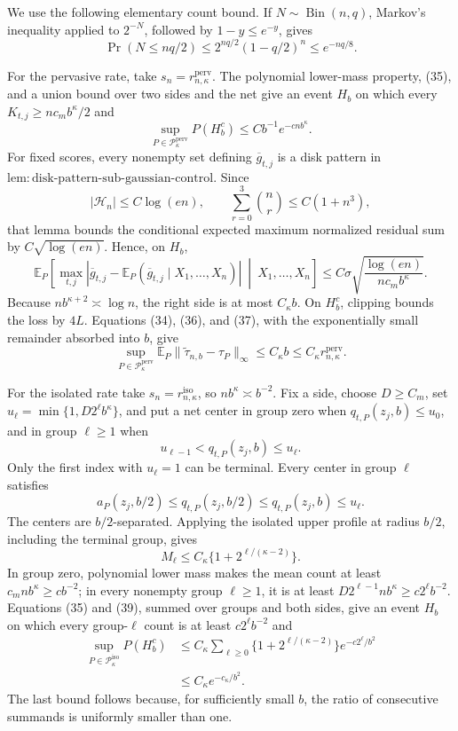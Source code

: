 We use the following elementary count bound. If \(N\sim\operatorname{Bin}(n,q)\), Markov's inequality applied to \(2^{-N}\), followed by \(1-y\le e^{-y}\), gives
\[
 \Pr(N\le nq/2)
 \le2^{nq/2}(1-q/2)^n
 \le e^{-nq/8}. \tag{35}
\]

For the pervasive rate, take \(s_n=r_{n,\kappa}^{\mathrm{perv}}\). The polynomial lower-mass property, (35), and a union bound over two sides and the net give an event \(H_b\) on which every \(K_{t,j}\ge nc_mb^{\kappa}/2\) and
\[
 \sup_{P\in\mathcal P_{\kappa}^{\mathrm{perv}}}P(H_b^c)
 \le Cb^{-1}e^{-cnb^{\kappa}}. \tag{36}
\]
For fixed scores, every nonempty set defining \(\overline g_{t,j}\) is a disk pattern in \(\mathrm{lem:disk\text{-}pattern\text{-}sub\text{-}gaussian\text{-}control}\). Since
\[
 |\mathcal H_n|\le C\log(en),
 \qquad \sum_{r=0}^3\binom nr\le C(1+n^3),
\]
that lemma bounds the conditional expected maximum normalized residual sum by \(C\sqrt{\log(en)}\). Hence, on \(H_b\),
\[
 \mathbb E_P\left[
 \max_{t,j}\left|
 \overline g_{t,j}-\mathbb E_P(\overline g_{t,j}\mid X_1,\ldots,X_n)
 \right|\ \middle|\ X_1,\ldots,X_n\right]
 \le C\sigma\sqrt{\frac{\log(en)}{nc_mb^{\kappa}}}. \tag{37}
\]
Because \(nb^{\kappa+2}\asymp\log n\), the right side is at most \(C_{\kappa}b\). On \(H_b^c\), clipping bounds the loss by \(4L\). Equations (34), (36), and (37), with the exponentially small remainder absorbed into \(b\), give
\[
 \sup_{P\in\mathcal P_{\kappa}^{\mathrm{perv}}}
 \mathbb E_P\lVert\widetilde\tau_{n,b}-\tau_P\rVert_{\infty}
 \le C_{\kappa}b
 \le C_{\kappa}r_{n,\kappa}^{\mathrm{perv}}. \tag{38}
\]

For the isolated rate take \(s_n=r_{n,\kappa}^{\mathrm{iso}}\), so \(nb^{\kappa}\asymp b^{-2}\). Fix a side, choose \(D\ge C_m\), set \(u_\ell=\min\{1,D2^\ell b^{\kappa}\}\), and put a net center in group zero when \(q_{t,P}(z_j,b)\le u_0\), and in group \(\ell\ge1\) when
\[
 u_{\ell-1}<q_{t,P}(z_j,b)\le u_\ell.
\]
Only the first index with \(u_\ell=1\) can be terminal. Every center in group \(\ell\) satisfies
\[
 a_P(z_j,b/2)\le q_{t,P}(z_j,b/2)\le q_{t,P}(z_j,b)\le u_\ell.
\]
The centers are \(b/2\)-separated. Applying the isolated upper profile at radius \(b/2\), including the terminal group, gives
\[
 M_\ell\le C_{\kappa}\{1+2^{\ell/(\kappa-2)}\}. \tag{39}
\]
In group zero, polynomial lower mass makes the mean count at least \(c_mnb^{\kappa}\ge cb^{-2}\); in every nonempty group \(\ell\ge1\), it is at least \(D2^{\ell-1}nb^{\kappa}\ge c2^\ell b^{-2}\). Equations (35) and (39), summed over groups and both sides, give an event \(H_b\) on which every group-\(\ell\) count is at least \(c2^\ell b^{-2}\) and
\[
 \begin{aligned}
 \sup_{P\in\mathcal P_{\kappa}^{\mathrm{iso}}}P(H_b^c)
 &\le C_{\kappa}\sum_{\ell\ge0}
 \{1+2^{\ell/(\kappa-2)}\}e^{-c2^\ell/b^2}\\
 &\le C_{\kappa}e^{-c_{\kappa}/b^2}. 
 \end{aligned} \tag{40}
\]
The last bound follows because, for sufficiently small \(b\), the ratio of consecutive summands is uniformly smaller than one.

